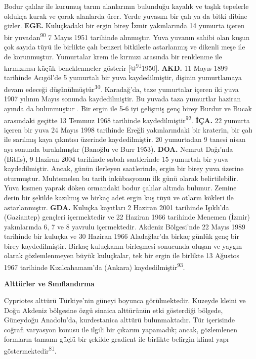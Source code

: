 \documentclass[
  letterpaper,
  DIV=11,
  numbers=noendperiod]{scrreprt}
\begin{document}
Bodur çalılar ile kurumuş tarım alanlarının bulunduğu kayalık ve taşlık
tepelerle oldukça kurak ve çorak alanlarda ürer. Yerde yuvasını bir çalı
ya da bitki dibine gizler. \textbf{EGE.} Kuluçkadaki bir ergin birey
İzmir yakınlarında 14 yumurta içeren bir yuvadan\textsuperscript{90} 7
Mayıs 1951 tarihinde alınmıştır. Yuva yuvanın sahibi olan kuşun çok
sayıda tüyü ile birlikte çalı benzeri bitkilerle astarlanmış ve dikenli
meşe ile de korunmuştur. Yumurtalar krem ile kırmızı arasında bir
renklenme ile kırmızımsı küçük beneklenmeler gösterir
{[}@\textsuperscript{91}1950{]}. \textbf{AKD.} 11 Mayıs 1899 tarihinde
Acıgöl'de 5 yumurtalı bir yuva kaydedilmiştir, dişinin yumurtlamaya
devam edeceği düşünülmüştür\textsuperscript{30}. Karadağ'da, taze
yumurtalar içeren iki yuva 1907 yılının Mayıs sonunda kaydedilmiştir. Bu
yuvada taza yumurtlar haziran ayında da bulunmuştur . Bir ergin ile 5-6
iyi gelişmiş genç birey Burdur ve Bucak arasındaki geçitte 13 Temmuz
1968 tarihinde kaydedilmiştir\textsuperscript{92}. \textbf{İÇA.} 22
yumurta içeren bir yuva 24 Mayıs 1998 tarihinde Ereğli yakınlarındaki
bir kraterin, bir çalı ile sarılmış kaya çıkıntısı üzerinde
kaydedilmiştir. 20 yumurtadan 9 tanesi nisan ayı sonunda bırakılmıştır
(Banoğlu ve Burr 1953). \textbf{DOA.} Nemrut Dağı'nda (Bitlis), 9
Haziran 2004 tarihinde sabah saatlerinde 15 yumurtalı bir yuva
kaydedilmiştir. Ancak, günün ilerleyen saatlerinde, ergin bir birey yuva
üzerine oturmuştur. Muhtemelen bu tarih inkübasyonun ilk günü olarak
belirtilebilir. Yuva kısmen yaprak döken ormandaki bodur çalılar altında
bulunur. Zemine derin bir şekilde kazılmış ve birkaç adet ergin kuş tüyü
ve otların kökleri ile astarlanmıştır. \textbf{GDA.} Kuluçka kayıtları 2
Haziran 2001 tarihinde Işıklı'da (Gaziantep) gençleri içermektedir ve 22
Haziran 1966 tarihinde Menemen (İzmir) yakınlarında 6, 7 ve 8 yavrulu
içermektedir. Akdeniz Bölgesi'nde 22 Mayıs 1989 tarihinde bir kuluçka ve
30 Haziran 1966 Aladağlar'da birkaç günlük genç bir birey
kaydedilmiştir. Birkaç kuluçkanın birleşmesi sonucunda oluşan ve yaygın
olarak gözlemlenmeyen büyük kuluçkalar, tek bir ergin ile birlikte 13
Ağustos 1967 tarihinde Kızılcahamam'da (Ankara)
kaydedilmiştir\textsuperscript{93}.

\textbf{Alttürler ve Sınıflandırma}

Cypriotes alttürü Türkiye'nin güneyi boyunca görülmektedir. Kuzeyde
kleini ve Doğu Akdeniz bölgesine özgü sinaica alttürünün etki gösterdiği
bölgede, Güneydoğu Anadolu'da, kurdestanica alttürü bulunmaktadır. Tür
içerisinde coğrafi varyasyon konusu ile ilgili bir çıkarım yapamadık;
ancak, gözlemlenen formların tamamı güçlü bir şekilde gradient ile
birlikte belirgin klinal yapı göstermektedir\textsuperscript{81}.
\end{document}
